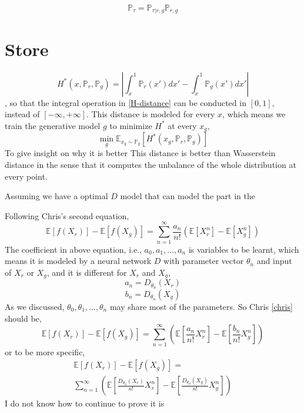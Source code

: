 \documentclass[letterpaper]{article} %
\begin{document}
\begin{equation}
  \mathbb{P}_{\tau} = \mathbb{P}_{\tau|r,g} \mathbb{P}_{r,g}
\end{equation}

\section{Store}

\begin{equation}\label{H-distance}
  H^{\ast}(x,\mathbb{P}_r,\mathbb{P}_g)=| \int_{x}^{1} \mathbb{P}_r(x') d x' - \int_{x}^{1} \mathbb{P}_g(x') d x' |
\end{equation}
, so that the integral operation in \eqref{H-distance} can be conducted in $[0,1]$, instead of $[-\infty,+\infty]$. This distance is modeled for every $x$, which means we train the generative model $g$ to minimize $H^{\ast}$ at every $x_g$,
\begin{equation}\label{g-update-rules}
  \min_{g}\mathbb{E}_{x_g \sim \mathbb{P}_g} [H^{\ast}(x_g,\mathbb{P}_r,\mathbb{P}_g)]
\end{equation}
To give insight on why it is better
This distance is better than Wasserstein distance in the sense that it computes the unbalance of the whole distribution at every point.


Assuming we have a optimal $D$ model that can model the part in the

Following Chris's second equation,
\begin{equation}\label{chris}
  \mathbb{E}[f(X_r)] - \mathbb{E}[f(X_g)] = \sum_{n=1}^{\infty} \frac{a_n}{n!}(\mathbb{E}[X_r^n]-\mathbb{E}[X_g^n])
\end{equation}
The coefficient in above equation, i.e., $a_0,a_1,...,a_n$ is variables to be learnt, which means it is modeled by a neural network $D$ with parameter vector $\theta_n$ and input of $X_r$ or $X_g$, and it is different for $X_r$ and $X_g$,
\begin{equation}\label{a}
  a_n = D_{\theta_n}({X_r})
\end{equation}
\begin{equation}\label{b}
  b_n = D_{\theta_n}({X_g})
\end{equation}
As we discussed, $\theta_0, \theta_1,...,\theta_n$ may share most of the parameters. So Chris \eqref{chris} should be,
\begin{equation}\label{chris-actual}
  \mathbb{E}[f(X_r)] - \mathbb{E}[f(X_g)] = \sum_{n=1}^{\infty} (\mathbb{E}[\frac{a_n}{n!}X_r^n]-\mathbb{E}[\frac{b_n}{n!}X_g^n])
\end{equation}
or to be more specific,
\begin{multline}\label{chris-actual}
  \mathbb{E}[f(X_r)] - \mathbb{E}[f(X_g)] = \\
  \sum_{n=1}^{\infty} (\mathbb{E}[\frac{D_{\theta_n}({X_r})}{n!}X_r^n]-\mathbb{E}[\frac{D_{\theta_n}({X_g})}{n!}X_g^n])
\end{multline}
I do not know how to continue to prove it is
\end{document}
